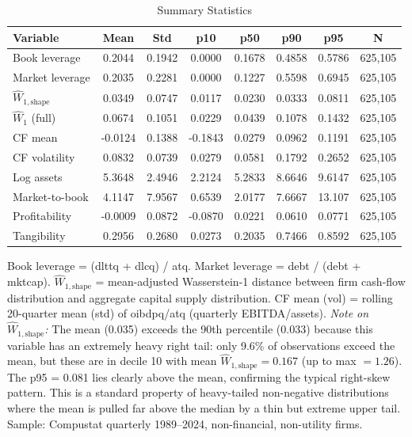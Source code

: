 \begin{table}[htbp]
\centering
\caption{Summary Statistics}
\label{tab:summary_stats}
\begin{threeparttable}
\begin{tabular}{lccccccc}
\toprule
Variable & Mean & Std & p10 & p50 & p90 & p95 & N \\
\midrule
Book leverage & 0.2044 & 0.1942 & 0.0000 & 0.1678 & 0.4858 & 0.5786 & 625,105 \\
Market leverage & 0.2035 & 0.2281 & 0.0000 & 0.1227 & 0.5598 & 0.6945 & 625,105 \\
$\widehat{W}_{1,\text{shape}}$ & 0.0349 & 0.0747 & 0.0117 & 0.0230 & 0.0333 & 0.0811 & 625,105 \\
$\widehat{W}_1$ (full) & 0.0674 & 0.1051 & 0.0229 & 0.0439 & 0.1078 & 0.1432 & 625,105 \\
CF mean & -0.0124 & 0.1388 & -0.1843 & 0.0279 & 0.0962 & 0.1191 & 625,105 \\
CF volatility & 0.0832 & 0.0739 & 0.0279 & 0.0581 & 0.1792 & 0.2652 & 625,105 \\
Log assets & 5.3648 & 2.4946 & 2.2124 & 5.2833 & 8.6646 & 9.6147 & 625,105 \\
Market-to-book & 4.1147 & 7.9567 & 0.6539 & 2.0177 & 7.6667 & 13.107 & 625,105 \\
Profitability & -0.0009 & 0.0872 & -0.0870 & 0.0221 & 0.0610 & 0.0771 & 625,105 \\
Tangibility & 0.2956 & 0.2680 & 0.0273 & 0.2035 & 0.7466 & 0.8592 & 625,105 \\
\bottomrule
\end{tabular}
\begin{tablenotes}
\small
\item Book leverage = (dlttq + dlcq) / atq. Market leverage = debt / (debt + mktcap).
$\widehat{W}_{1,\text{shape}}$ = mean-adjusted Wasserstein-1 distance between firm
cash-flow distribution and aggregate capital supply distribution.
CF mean (vol) = rolling 20-quarter mean (std) of oibdpq/atq (quarterly EBITDA/assets).
\textit{Note on} $\widehat{W}_{1,\text{shape}}$\textit{:} The mean (0.035) exceeds the 90th percentile (0.033) because this variable has an extremely heavy right tail: only 9.6\% of observations exceed the mean, but these are in decile 10 with mean $\widehat{W}_{1,\text{shape}} = 0.167$ (up to max $= 1.26$). The p95 = 0.081 lies clearly above the mean, confirming the typical right-skew pattern. This is a standard property of heavy-tailed non-negative distributions where the mean is pulled far above the median by a thin but extreme upper tail.
Sample: Compustat quarterly 1989--2024, non-financial, non-utility firms.
\end{tablenotes}
\end{threeparttable}
\end{table}
